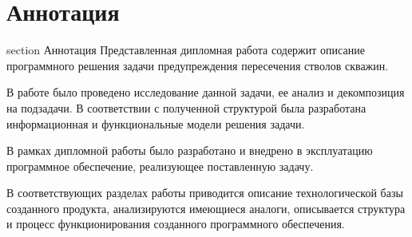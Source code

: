 \newpage
\section*{ Аннотация}
 {section} {Аннотация}
Представленная дипломная работа содержит описание программного решения задачи предупреждения пересечения стволов скважин.

В работе было проведено исследование данной задачи, ее анализ и декомпозиция на подзадачи. В соответствии с полученной структурой была
разработана информационная и функциональные модели решения задачи.

В рамках дипломной работы было разработано и внедрено в эксплуатацию программное обеспечение, реализующее поставленную задачу.

В соответствующих разделах работы приводится описание технологической базы созданного продукта, анализируются имеющиеся аналоги, описывается структура и
процесс функционирования созданного программного обеспечения.

